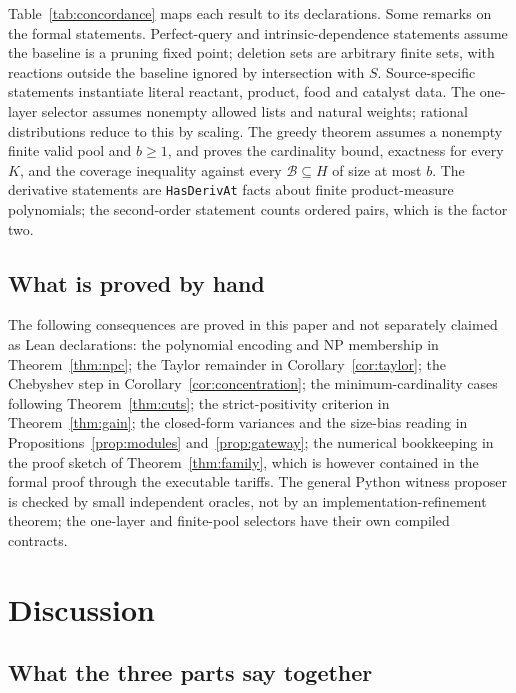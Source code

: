 \documentclass[11pt,a4paper]{article}
\theoremstyle{plain}
\theoremstyle{definition}
\theoremstyle{remark}
\newcommand{\lean}[1]{\texttt{#1}}
\begin{document}
Table~\ref{tab:concordance} maps each result to its declarations. Some remarks on the formal statements. Perfect-query and intrinsic-dependence statements assume the baseline is a pruning fixed point; deletion sets are arbitrary finite sets, with reactions outside the baseline ignored by intersection with $S$. Source-specific statements instantiate literal reactant, product, food and catalyst data. The one-layer selector assumes nonempty allowed lists and natural weights; rational distributions reduce to this by scaling. The greedy theorem assumes a nonempty finite valid pool and $b\ge1$, and proves the cardinality bound, exactness for every $K$, and the coverage inequality against every $\mathcal B\subseteq H$ of size at most $b$. The derivative statements are \lean{HasDerivAt} facts about finite product-measure polynomials; the second-order statement counts ordered pairs, which is the factor two.

\subsection{What is proved by hand}\label{sec:notformal}

The following consequences are proved in this paper and not separately claimed as Lean declarations: the polynomial encoding and NP membership in Theorem~\ref{thm:npc}; the Taylor remainder in Corollary~\ref{cor:taylor}; the Chebyshev step in Corollary~\ref{cor:concentration}; the minimum-cardinality cases following Theorem~\ref{thm:cuts}; the strict-positivity criterion in Theorem~\ref{thm:gain}; the closed-form variances and the size-bias reading in Propositions~\ref{prop:modules} and~\ref{prop:gateway}; the numerical bookkeeping in the proof sketch of Theorem~\ref{thm:family}, which is however contained in the formal proof through the executable tariffs. The general Python witness proposer is checked by small independent oracles, not by an implementation-refinement theorem; the one-layer and finite-pool selectors have their own compiled contracts.

\section{Discussion}\label{sec:discussion}

\subsection{What the three parts say together}
\end{document}

